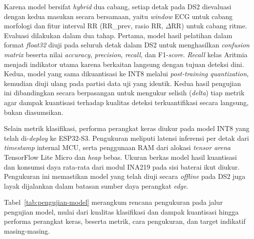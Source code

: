 Karena model bersifat \textit{hybrid} dua cabang, setiap detak pada DS2 dievaluasi dengan kedua masukan secara bersamaan, yaitu \textit{window} ECG untuk cabang morfologi dan fitur interval RR (RR\_prev, rasio RR, $\Delta$RR) untuk cabang ritme. Evaluasi dilakukan dalam dua tahap. Pertama, model hasil pelatihan dalam format \textit{float32} diuji pada seluruh detak dalam DS2 untuk menghasilkan \textit{confusion matrix} beserta nilai \textit{accuracy}, \textit{precision}, \textit{recall}, dan F1-\textit{score}. \textit{Recall} kelas Aritmia menjadi indikator utama karena berkaitan langsung dengan tujuan deteksi dini. Kedua, model yang sama dikuantisasi ke INT8 melalui \textit{post-training quantization}, kemudian diuji ulang pada partisi data uji yang identik. Kedua hasil pengujian ini dibandingkan secara berpasangan untuk mengukur selisih (\textit{delta}) tiap metrik agar dampak kuantisasi terhadap kualitas deteksi terkuantifikasi secara langsung, bukan diasumsikan.

Selain metrik klasifikasi, performa perangkat keras diukur pada model INT8 yang telah di-\textit{deploy} ke ESP32-S3. Pengukuran meliputi latensi inferensi per detak dari \textit{timestamp} internal MCU, serta penggunaan RAM dari alokasi \textit{tensor arena} TensorFlow Lite Micro dan \textit{heap} bebas. Ukuran berkas model hasil kuantisasi dan konsumsi daya rata-rata dari modul INA219 pada sisi baterai ikut diukur. Pengukuran ini memastikan model yang telah diuji secara \textit{offline} pada DS2 juga layak dijalankan dalam batasan sumber daya perangkat \textit{edge}.

Tabel~\ref{tab:pengujian-model} merangkum rencana pengukuran pada jalur pengujian model, mulai dari kualitas klasifikasi dan dampak kuantisasi hingga performa perangkat keras, beserta metrik, cara pengukuran, dan target indikatif masing-masing.

